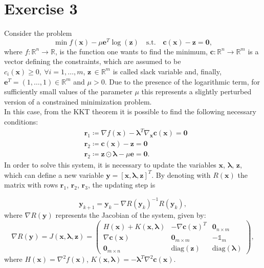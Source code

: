 \documentclass[a4paper,11pt]{article}
\newcommand{\R}{\mathbb{R}}
\begin{document}
\section*{Exercise 3}
Consider the problem
\begin{equation}
	\min f(\textbf{x}) - \mu \textbf{e}^{T}\log(\textbf{z}) \quad \text{s.t.} \quad \textbf{c}(\textbf{x})- \textbf{z} = \textbf{0},
	\label{eq:pert_min_prob}
\end{equation}
where $f : \R^{n} \rightarrow \R$, is the function one wants to find the minimum, $\textbf{c} : \R^{n} \rightarrow \R^{m}$ is a vector defining the constraints, which are assumed to be $c_{i}(\textbf{x})\ge0, \ \forall i=1,\dots,m$, $\textbf{z}\, \in \R^{m}$ is called slack variable and, finally, $\textbf{e}^{T}=(1,\dots,1)\in \R^{m}$ and $\mu>0$. Due to the presence of the logarithmic term, for sufficiently small values of the parameter $\mu$ this represents a slightly perturbed version of a constrained minimization problem.\\

\noindent In this case, from the KKT theorem it is possible to find the following necessary conditions:
\begin{align}
	& \textbf{r}_{1} \coloneqq \nabla f(\textbf{x}) - \boldsymbol{\lambda}^{T}\nabla_{\textbf{x}}\textbf{c}(\textbf{x}) = \textbf{0} \\
	& \textbf{r}_{2} \coloneqq \textbf{c}(\textbf{x}) - \textbf{z} = \textbf{0} \\
	& \textbf{r}_{2} \coloneqq \textbf{z} \odot  \boldsymbol{\lambda} - \mu \textbf{e} = \textbf{0}.
\end{align}
In order to solve this system, it is necessary to update the variables $\textbf{x}$, $\boldsymbol{\lambda}$, $\textbf{z}$, which can define a new variable $\textbf{y} = [\textbf{x}, \boldsymbol{\lambda}, \textbf{z}]^{T}$. By denoting with $R(\textbf{x})$ the matrix with rows $\textbf{r}_{1}$, $\textbf{r}_{2}$, $\textbf{r}_{3}$, the updating step is

\begin{equation}
	\textbf{y}_{k+1} = \textbf{y}_{k} - \nabla R(\textbf{y}_{k})^{-1} R(\textbf{y}_{k}),
\end{equation}
where $\nabla R(\textbf{y})$ represents the Jacobian of the system, given by:
\begin{equation}
	\nabla R(\textbf{y}) = J(\textbf{x}, \boldsymbol{\lambda},\textbf{z}) =  
	\begin{pmatrix}
		H(\textbf{x}) + K(\textbf{x}, \boldsymbol{\lambda}) & -\nabla\textbf{c}(\textbf{x})^{T} & \textbf{0}_{n\times m}\\
		\nabla\textbf{c}(\textbf{x}) & \textbf{0}_{m\times m} & -\mathbb{1}_{m}\\
		\textbf{0}_{m\times n} & \text{diag}(\textbf{z}) & \text{diag}(\boldsymbol{\lambda})
	\end{pmatrix},
\end{equation}
where $H(\textbf{x}) = \nabla^{2}f(\textbf{x})$, $K(\textbf{x},\boldsymbol{\lambda})=-\boldsymbol{\lambda}^{T}\nabla^{2}\textbf{c}(\textbf{x})$.\\
\end{document}
